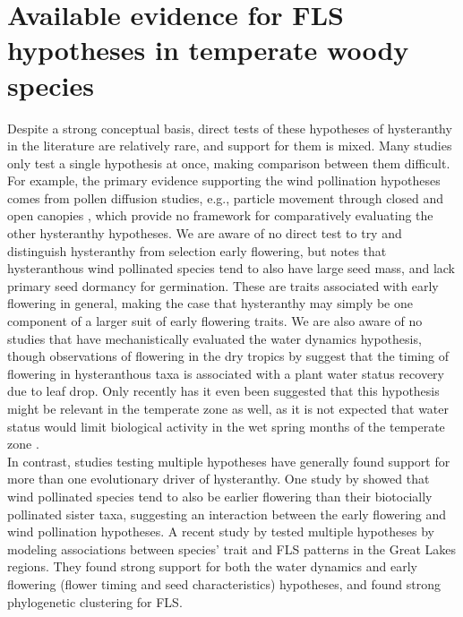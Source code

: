 \documentclass[12pt]{article}\usepackage[]{graphicx}\usepackage[]{color}
\begin{document}

\section*{Available evidence for FLS hypotheses in temperate woody species} %
\indent\indent Despite a strong conceptual basis, direct tests of these hypotheses of hysteranthy in the literature are relatively rare, and support for them is mixed.  Many studies only test a single hypothesis at once, making comparison between them difficult. For example, the primary evidence supporting the wind pollination hypotheses comes from pollen diffusion studies, e.g., particle movement through closed and open canopies \citep{Niklas1985,Nathan2005, Milleron2012}, which provide no framework for comparatively evaluating the other hysteranthy hypotheses. We are aware of no direct test to try and distinguish hysteranthy from selection early flowering, but \citet{Primack1987} notes that hysteranthous wind pollinated species tend to also have large seed mass, and lack primary seed dormancy for germination. These are traits associated with early flowering in general, making the case that hysteranthy may simply be one component of a larger suit of early flowering traits. We are also aware of no studies that have mechanistically evaluated the water dynamics hypothesis, though observations of flowering in the dry tropics by \citet{Borchert1983,Reich1984} suggest that the timing of flowering in hysteranthous taxa is associated with a plant water status recovery due to leaf drop. Only recently has it even been suggested that this hypothesis might be relevant in the temperate zone as well, as it is not expected that water status would limit biological activity in the wet spring months of the temperate zone \citep{Gougherty2018}.\\
\indent In contrast, studies testing multiple hypotheses have generally found support for more than one evolutionary driver of hysteranthy. One study by \citet{Bolmgren2003} showed that wind pollinated species tend to also be earlier flowering than their biotocially pollinated sister taxa, suggesting an interaction between the early flowering and wind pollination hypotheses. A recent study by \citet{Gougherty2018} tested multiple hypotheses by modeling associations between species' trait and FLS patterns in the Great Lakes regions. They found strong support for both the water dynamics and early flowering (flower timing and seed characteristics) hypotheses, and found strong phylogenetic clustering for FLS. \\
\end{document}
